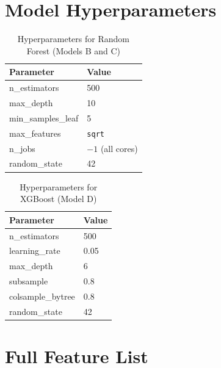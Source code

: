 \documentclass[12pt, a4paper, oneside]{report}
\begin{document}
\begin{appendices}
\chapter{Model Hyperparameters}
\label{app:hyperparams}

\begin{table}[H]
\centering
\caption{Hyperparameters for Random Forest (Models B and C)}
\begin{tabular}{ll}
\toprule
\textbf{Parameter} & \textbf{Value} \\
\midrule
n\_estimators   & 500 \\
max\_depth      & 10  \\
min\_samples\_leaf & 5 \\
max\_features   & \texttt{sqrt} \\
n\_jobs         & $-1$ (all cores) \\
random\_state   & 42 \\
\bottomrule
\end{tabular}
\end{table}

\begin{table}[H]
\centering
\caption{Hyperparameters for XGBoost (Model D)}
\begin{tabular}{ll}
\toprule
\textbf{Parameter} & \textbf{Value} \\
\midrule
n\_estimators     & 500 \\
learning\_rate    & 0.05 \\
max\_depth        & 6 \\
subsample         & 0.8 \\
colsample\_bytree & 0.8 \\
random\_state     & 42 \\
\bottomrule
\end{tabular}
\end{table}

\chapter{Full Feature List}
\label{app:features}


\end{appendices}
\end{document}
